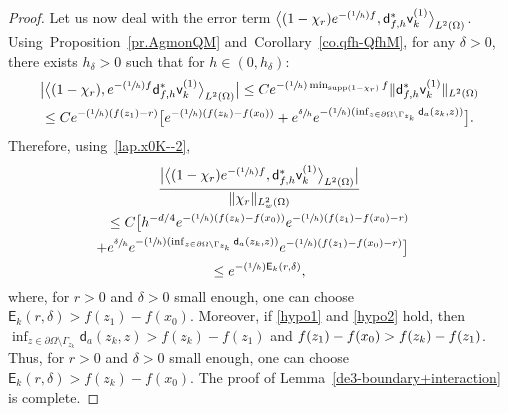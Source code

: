 \documentclass[10pt]{amsart}
\newcommand{\Psfrac}[2]{(\sfrac{#1}{#2})}
\let\lp\langle
\let\rp\rangle
\DeclareMathOperator\supp{supp}
\theoremstyle{plain}
\theoremstyle{definition}
\begin{document}
\begin{proof}
Let us now deal with the error term $ \big \lp (1- \chi_r) e^{-\Psfrac 1hf}, \mathsf d^*_{f,h} \mathsf v_k^{(1)}\big\rp_{L^2(\Omega)} $.
Using~Proposition~\ref{pr.AgmonQM} and~Corollary~\ref{co.qfh-QfhM}, for any $\delta>0$, there exists $h_\delta>0$ such that for $h\in (0,h_\delta)$:\vspace*{-3pt}
\begin{multline*}
\big \vert \big \lp(1- \chi_r),e^{-\Psfrac 1hf}\mathsf d^*_{f,h} \mathsf v_k^{(1)}\big\rp_{L^2(\Omega)}\big \vert \le C e^{-\Psfrac 1h \min_{ \supp (1-\chi_r) }f }\Vert\mathsf d^*_{f,h} \mathsf v_k^{(1)} \Vert_{L^2(\Omega)} \\
\le Ce^{-\Psfrac 1h (f(z_1)-r)} \big[ e^{-\Psfrac 1h(f(z_k)-f(x_0))}+e^{\sfrac{ \delta }{h}} e^{-\Psfrac 1h(\inf_{z\in \partial \Omega \setminus \Gamma_{z_k}} \mathsf d_a(z_k,z))}\big].
\end{multline*}
\enlargethispage{-2\baselineskip}
\pagebreak[2]
Therefore, using~\eqref{lap.x0K--2},\vspace*{-3pt}
\begin{multline*}
\frac{ \big \vert \big \lp (1- \chi_r) e^{-\Psfrac 1hf}, \mathsf d^*_{f,h} \mathsf v_k^{(1)}\big\rp_{L^2(\Omega)} \big \vert }{\Vert \chi_r\Vert_{L^2_w(\Omega)}}\\
\le C\big[ h^{-d/4} e^{-\Psfrac 1h(f(z_k)-f(x_0))} e^{-\Psfrac 1h(f(z_1)-f(x_0)-r)}\\
\shoveright{+ e^{\sfrac{ \delta }{h}} e^{-\Psfrac 1h(\inf_{z\in \partial \Omega \setminus \Gamma_{z_k}} \mathsf d_a(z_k,z))}e^{-\Psfrac 1h (f(z_1)-f(x_0)-r)}\big]}\\
\le e^{-\Psfrac1h \mathsf E_k(r,\delta) },
\end{multline*}
where, for $r>0$ and $\delta>0$ small enough, one can choose
$\mathsf E_k(r,\delta)>f(z_1)-f(x_0)$. Moreover, if \eqref{hypo1}
and \eqref{hypo2} hold, then $\inf_{z\in \partial \Omega \setminus
\Gamma_{z_k}} \mathsf d_a(z_k,z)>f(z_k)-f(z_1)$ and
$f(z_1)-\nobreak f(x_0)>f(z_k)-f(z_1)$. Thus, for $r>0$ and $\delta>0$ small
enough, one can choose $\mathsf E_k(r,\delta)>f(z_k)-f(x_0)$.
The proof of Lemma~\ref{de3-boundary+interaction} is complete.
\end{proof}
\end{document}

